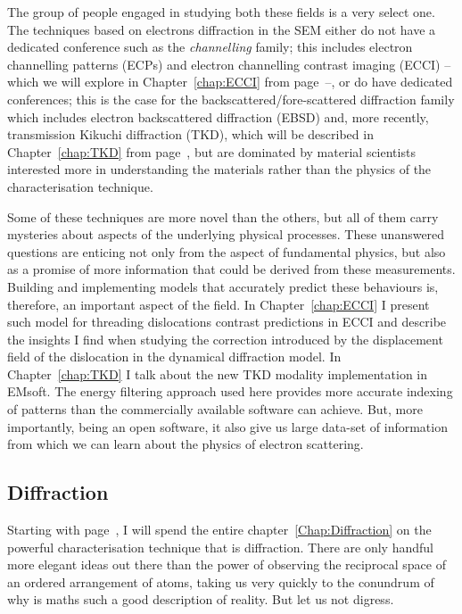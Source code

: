 The group of people engaged in studying both these fields is a very select one. The techniques based on electrons diffraction in the SEM either do not have a dedicated conference such as the \textit{channelling} family; this includes electron channelling patterns (ECPs) and electron channelling contrast imaging (ECCI) -- which we will explore in Chapter~\ref{chap:ECCI} from page~\pageref{chap:ECCI}--, or do have dedicated conferences; this is the case for the backscattered/fore-scattered diffraction family which includes electron backscattered diffraction (EBSD) and, more recently, transmission Kikuchi diffraction (TKD), which will be described in Chapter~\ref{chap:TKD} from page~\pageref{chap:TKD}, but are dominated by material scientists interested more in understanding the materials rather than the physics of the characterisation technique. 



Some of these techniques are more novel than the others, but all of them carry mysteries about aspects of the underlying physical processes. These unanswered questions are enticing not only from the aspect of fundamental physics, but also as a promise of more information that could be derived from these measurements. Building and implementing models that accurately predict these behaviours is, therefore, an important aspect of the field. In Chapter~\ref{chap:ECCI} I present such model for threading dislocations contrast predictions in ECCI and describe the insights I find when studying the correction introduced by the displacement field of the dislocation in the dynamical diffraction model. In Chapter~\ref{chap:TKD} I talk about the new TKD modality implementation in EMsoft. The energy filtering approach used here provides more accurate indexing of patterns than the commercially available software can achieve. But, more importantly, being an open software, it also give us large data-set of information from which we can learn about the physics of electron scattering.  





\subsection{Diffraction}

Starting with page~\pageref{Chap:Diffraction}, I will spend the entire chapter~\ref{Chap:Diffraction} on the powerful characterisation technique that is diffraction. There are only handful more elegant ideas out there than the power of observing the reciprocal space of an ordered arrangement of atoms, taking us very quickly to the conundrum of why is maths such a good description of reality.  But let us not digress. 

